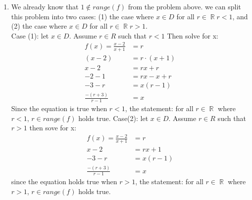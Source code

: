 \documentclass[11pt,twoside]{amsart}
\DeclareMathOperator*{\R}{\mathbb{R}} \DeclareMathOperator*{\N}{\mathbb{N}} \DeclareMathOperator*{\Q}{\mathbb{Q}} \DeclareMathOperator*{\Z}{\mathbb{Z}} \DeclareMathOperator*{\E}{\mathbb{E}} \DeclareMathOperator*{\C}{\mathbb{C}} \DeclareMathOperator*{\A}{\mathbb{A}}
\theoremstyle{definition}
\begin{document}
\begin{enumerate}[label= 1.\arabic*), itemsep=0.4cm]
  \item %
  We already know that $1 \notin range(f)$ from the problem above. we can split this problem into two cases: (1) the case where $x \in D$ for all $r \in \R r < 1$, and (2) the case where $x \in D$ for all $r \in \R r>1$.\\
  Case (1): let $x \in D$. Assume $r \in R$ such that $r<1$ Then solve for x:
    \begin{align*}
      f(x) = \frac{x-2}{x+1} &= r \\
                       (x-2) &= r \cdot (x+1) \\ 
                       x-2  &= rx + r \\ 
                       -2-1 &= rx-x+r \\ 
                       -3-r &= x(r-1) \\
         \frac{-(r+3)}{r-1} &= x
    \end{align*}
    Since the equation is true when $r < 1$, the statement: for all $r \in \R$ where $r<1$, $r \in range(f)$ holds true. 
    Case(2): let $x \in D$. Assume $r \in R$ such that $r>1$ then sove for x:
    \begin{align*}
      f(x) = \frac{x-2}{x+1} &= r \\
                      x - 2  &= rx +1 \\
                      -3-r &= x(r-1) \\
         \frac{-(r+3)}{r-1}&= x
    \end{align*}
    since the equation holds true when $r>1$, the statement: for all $r \in \R$ where $r>1$, $r \in range(f)$ holds true.

\end{enumerate}
\end{document}
